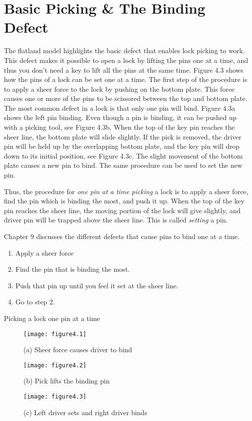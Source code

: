 \chapter{Basic Picking \& The Binding Defect}
The flatland model highlights the basic defect that enables lock picking to work.
This defect makes it possible to open a lock by lifting the pins one at a time, and thus you don't need a key to lift all the pins at the same time.
Figure 4.3 shows how the pins of a lock can be set one at a time.
The first step of the procedure is to apply a sheer force to the lock by pushing on the bottom plate.
This force causes one or more of the pins to be scissored between the top and bottom plate.
The most common defect in a lock is that only one pin will bind.
Figure 4.3a shows the left pin binding.
Even though a pin is binding, it can be pushed up with a picking tool, see Figure 4.3b.
When the top of the key pin reaches the sheer line, the bottom plate will slide slightly.
If the pick is removed, the driver pin will be held up by the overlapping bottom plate, and the key pin will drop down to its initial position, see Figure 4.3c.
The slight movement of the bottom plate causes a new pin to bind.
The same procedure can be used to set the new pin.

Thus, the procedure for \textit{one pin at a time picking} a lock is to apply a sheer force, find the pin which is binding the most, and push it up.
When the top of the key pin reaches the sheer line, the moving portion of the lock will give slightly, and driver pin will be trapped above the sheer line.
This is called \textit{setting} a pin.

Chapter 9 discusses the different defects that cause pins to bind one at a time.

\begin{table}
    \begin{enumerate}
        \item Apply a sheer force
        \item Find the pin that is binding the most.
        \item Push that pin up until you feel it set at the sheer line.
        \item Go to step 2.
    \end{enumerate}
    \caption{Picking a lock one pin at a time}
\end{table}

\begin{figure}
    \texttt{[image: figure4.1]}
    \caption{(a) Sheer force causes driver to bind}
\end{figure}

\begin{figure}
    \texttt{[image: figure4.2]}
    \caption{(b) Pick lifts the binding pin}
\end{figure}

\begin{figure}
    \texttt{[image: figure4.3]}
    \caption{(c) Left driver sets and right driver binds}
\end{figure}
